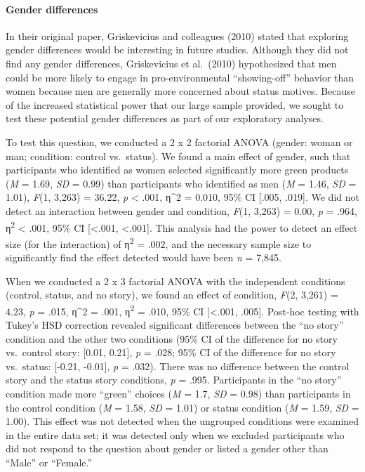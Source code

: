 \documentclass[
]{article}
\begin{document}
\paragraph{Gender differences}\label{gender-differences}

In their original paper, Griskevicius and colleagues (2010) stated that
exploring gender differences would be interesting in future studies.
Although they did not find any gender differences, Griskevicius et
al.~(2010) hypothesized that men could be more likely to engage in
pro-environmental ``showing-off'' behavior than women because men are
generally more concerned about status motives. Because of the increased
statistical power that our large sample provided, we sought to test
these potential gender differences as part of our exploratory analyses.

To test this question, we conducted a 2 x 2 factorial ANOVA (gender:
woman or man; condition: control vs.~status). We found a main effect of
gender, such that participants who identified as women selected
significantly more green products (\emph{M} = 1.69, \emph{SD} = 0.99)
than participants who identified as men (\emph{M} = 1.46, \emph{SD} =
1.01), \emph{F}(1, 3,263) = 36.22, \emph{p} \textless{} .001, η\^{}2 =
0.010, 95\% CI {[}.005, .019{]}. We did not detect an interaction
between gender and condition, \emph{F}(1, 3,263) = 0.00, \emph{p} =
.964, η\textsuperscript{2} \textless{} .001, 95\% CI {[}\textless.001,
\textless.001{]}. This analysis had the power to detect an effect size
(for the interaction) of η\textsuperscript{2} = .002, and the necessary
sample size to significantly find the effect detected would have been
\emph{n} = 7,845.

When we conducted a 2 x 3 factorial ANOVA with the independent
conditions (control, status, and no story), we found an effect of
condition, \emph{F}(2, 3,261) = 4.23, \emph{p} = .015, η\^{}2 = .001,
η\textsuperscript{2} = .010, 95\% CI {[}\textless.001, .005{]}. Post-hoc
testing with Tukey's HSD correction revealed significant differences
between the ``no story'' condition and the other two conditions (95\% CI
of the difference for no story vs.~control story: {[}0.01, 0.21{]},
\emph{p} = .028; 95\% CI of the difference for no story vs.~status:
{[}-0.21, -0.01{]}, \emph{p} = .032). There was no difference between
the control story and the status story conditions, \emph{p} = .995.
Participants in the ``no story'' condition made more ``green'' choices
(\emph{M} = 1.7, \emph{SD} = 0.98) than participants in the control
condition (\emph{M} = 1.58, \emph{SD} = 1.01) or status condition
(\emph{M} = 1.59, \emph{SD} = 1.00). This effect was not detected when
the ungrouped conditions were examined in the entire data set; it was
detected only when we excluded participants who did not respond to the
question about gender or listed a gender other than ``Male'' or
``Female.''
\end{document}
